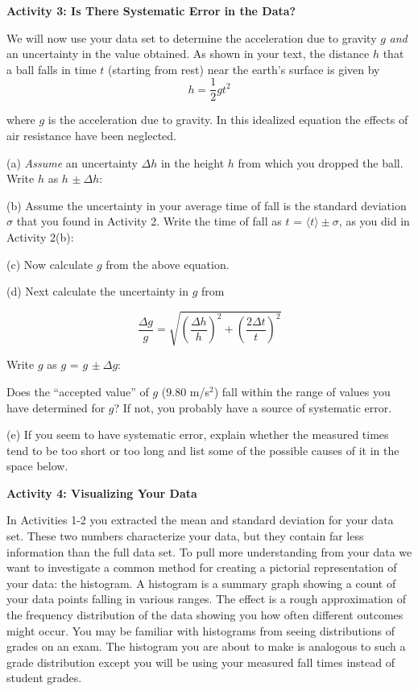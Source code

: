 \textbf{Activity 3: Is There Systematic Error in the Data? }

We will now use your data set to determine the acceleration due to gravity $g$ 
\emph{and} an uncertainty in the value obtained. As shown in your text, 
the distance $h$ that a ball falls in time $t$ (starting from rest) near the 
earth's surface is given by
\[
h=\frac{1}{2}gt^{2}\]


where $g$ is the acceleration due to gravity. In this idealized equation the 
effects of air resistance have been neglected. 

(a) \emph{Assume} an uncertainty \(\Delta h\) in the height $h$ from 
which you dropped the ball. 
Write $h$ as $h$ \(\pm\ \Delta h\):
\vspace{5mm}

(b) Assume the uncertainty in your average time of fall is the standard 
deviation \( \sigma  \) that you found in Activity 2. Write the time of fall 
as $t$ = \(\langle t\rangle \pm  \sigma  \), as you did in Activity 2(b):
\vspace{5mm}

(c) Now calculate $g$ from the above equation.
\vspace{15mm}

(d) Next calculate the uncertainty in $g$ from

$$
\frac{\Delta g}{g} = \sqrt{\left(\frac{\Delta h}{h}\right)^2 + \left(\frac{2\Delta t}{t}\right)^2}
$$
\vspace{15mm}

Write $g$ as $g$ = $g$ \(\pm\ \Delta g\):

Does the ``accepted value'' of $g$ (9.80 m/s$^2$) fall within the range of 
values you have determined for $g$? If not, you probably have a source of 
systematic error.

(e) If you seem to have systematic error, explain whether the measured times
tend to be too short or too long and list some of the possible causes of it
in the space below.
\vspace{30mm}

\textbf{Activity 4: Visualizing Your Data}

In Activities 1-2 you extracted the mean and standard deviation for your data set. 
These two numbers characterize your data, but they contain far less information than the full
data set.
To pull more understanding from your data we want to investigate a common method for
creating a pictorial representation of your data: the histogram.
A histogram is a summary graph showing a count of your data points falling in various ranges. 
The effect is a rough approximation of the frequency distribution of the data showing you how often different outcomes might occur.
You may be familiar with histograms from seeing distributions of grades on an exam.
The histogram you are about to make is analogous to such a grade distribution except you will be using your measured fall times
instead of student grades.

